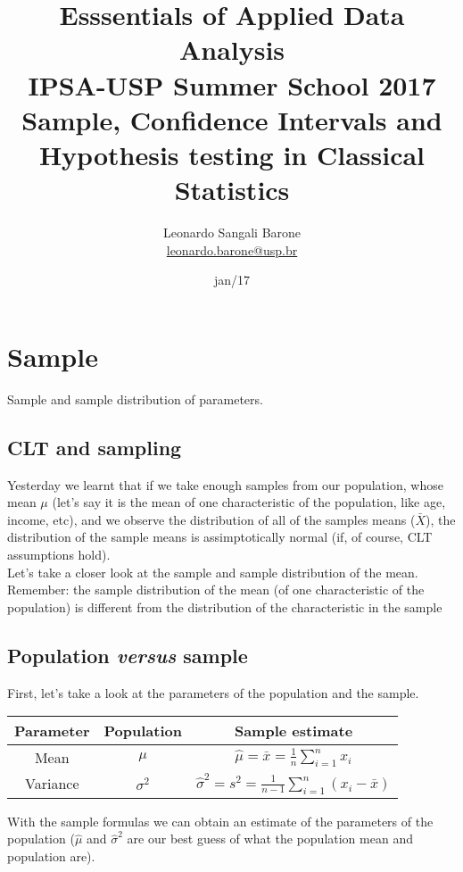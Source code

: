 \documentclass[11pt]{article}
\title{\textbf{Esssentials of Applied Data Analysis\\
				IPSA-USP Summer School 2017}\newline\\
				Sample, Confidence Intervals and Hypothesis testing in Classical Statistics}
\author{Leonardo Sangali Barone\\ \href{leonardo.barone@usp.br}{leonardo.barone@usp.br}}
\date{jan/17}
\begin{document}
\maketitle
\section{Sample}

Sample and sample distribution of parameters.

	\subsection*{CLT and sampling}
	Yesterday we learnt that if we take enough samples from our population, whose mean $\mu$ (let's say it is the mean of one characteristic of the population, like age, income, etc), and we observe the distribution of all of the samples means ($\bar{X}$), the distribution of the sample means is assimptotically normal (if, of course, CLT assumptions hold).
	\newline\\
	Let's take a closer look at the sample and sample distribution of the mean.
	\newline\\
	Remember: the sample distribution of the mean (of one characteristic of the population) is different from the distribution of the characteristic in the sample

	\subsection*{Population \emph{versus} sample}
	First, let's take a look at the parameters of the population and the sample.\newline\\

\begin{tabular}{|c|c|c|}
\hline
	Parameter & Population & Sample estimate\\ 
\hline
	Mean & $\mu$ & $\hat{\mu} = \bar{x} = \frac{1}{n}\sum\limits_{i=1}^n x_i $\\
	Variance & $\sigma^2$ & $\hat{\sigma}^2 = s^2 = \frac{1}{n-1}\sum\limits_{i=1}^n (x_i - \bar{x}) $\\

\hline
\end{tabular}

With the sample formulas we can obtain an estimate of the parameters of the population ($\hat{\mu}$ and $\hat{\sigma}^2$ are our best guess of what the population mean and population are).
\end{document}
